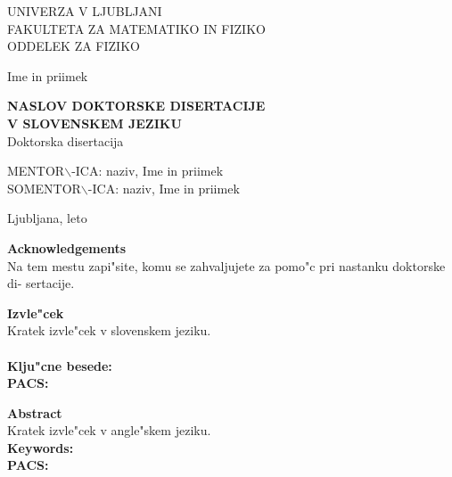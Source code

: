 \cleardoublepage
\begin{center}

{\large UNIVERZA V LJUBLJANI\\
FAKULTETA ZA MATEMATIKO IN FIZIKO\\
ODDELEK ZA FIZIKO\\}

\vspace{4cm}

{\Large Ime in priimek\\}

\vspace{10mm}

{\bf \Large NASLOV DOKTORSKE DISERTACIJE\\
 V SLOVENSKEM JEZIKU\\}
\vspace{5mm}
{\large Doktorska disertacija}\\

\vfill

{\large MENTOR$\backslash$-ICA: naziv, Ime in priimek\\
SOMENTOR$\backslash$-ICA: naziv, Ime in priimek\\}


\vspace{2cm}

{\large Ljubljana, leto}

\end{center}


\cleardoublepage
\mbox{}
\vfill
{\Large \bf Acknowledgements}
\vspace{1cm}\\
Na tem mestu zapi"site, komu se zahvaljujete za pomo"c 
pri nastanku doktorske di- sertacije.


\cleardoublepage
{\Large\bf Izvle"cek}
\vspace{1cm}\\
Kratek izvle"cek v slovenskem jeziku.\\
\vspace{1cm}\\
{\bf Klju"cne besede:}\\
{\bf PACS:}


\cleardoublepage
{\Large \bf Abstract}
\vspace{1cm}\\
Kratek izvle"cek v angle"skem jeziku.
\vspace{1cm}\\
{\bf Keywords:}\\
{\bf PACS:}

